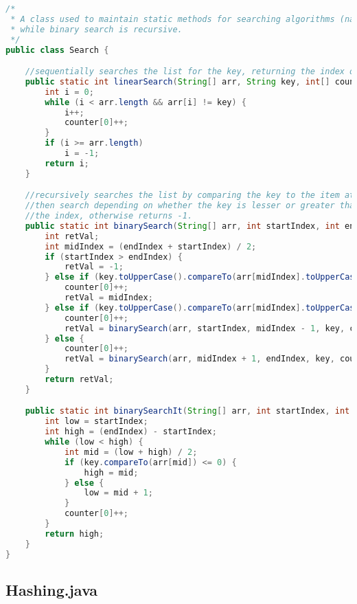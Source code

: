 \documentclass[letterpaper, 10pt,DIV=13]{scrartcl}
\numberwithin{equation}{section} %
\numberwithin{figure}{section} %
\numberwithin{table}{section} %
\begin{document}
\begin{lstlisting}[frame=single, language=java, breaklines]  
/*
 * A class used to maintain static methods for searching algorithms (namely linear search and binary search). Linear search is iterative,
 * while binary search is recursive.
 */
public class Search {

    //sequentially searches the list for the key, returning the index of where it was found. If it was not found, returns -1.
    public static int linearSearch(String[] arr, String key, int[] counter) {
        int i = 0;
        while (i < arr.length && arr[i] != key) {
            i++;
            counter[0]++;
        }
        if (i >= arr.length)
            i = -1;
        return i;
    }

    //recursively searches the list by comparing the key to the item at the middle of the list, then choosing half of the array to
    //then search depending on whether the key is lesser or greater than the element at the middle. If the element is found, returns
    //the index, otherwise returns -1.
    public static int binarySearch(String[] arr, int startIndex, int endIndex, String key, int[] counter) {
        int retVal;
        int midIndex = (endIndex + startIndex) / 2;
        if (startIndex > endIndex) {
            retVal = -1;
        } else if (key.toUpperCase().compareTo(arr[midIndex].toUpperCase()) == 0) {
            counter[0]++;
            retVal = midIndex;
        } else if (key.toUpperCase().compareTo(arr[midIndex].toUpperCase()) < 0) {
            counter[0]++;
            retVal = binarySearch(arr, startIndex, midIndex - 1, key, counter);
        } else {
            counter[0]++;
            retVal = binarySearch(arr, midIndex + 1, endIndex, key, counter);
        }
        return retVal;
    }

    public static int binarySearchIt(String[] arr, int startIndex, int endIndex, String key, int[] counter) {
        int low = startIndex;
        int high = (endIndex) - startIndex;
        while (low < high) {
            int mid = (low + high) / 2;
            if (key.compareTo(arr[mid]) <= 0) {
                high = mid;
            } else {
                low = mid + 1;
            }
            counter[0]++;
        }
        return high;
    }
}
\end{lstlisting}


\subsection{Hashing.java}
\end{document}
